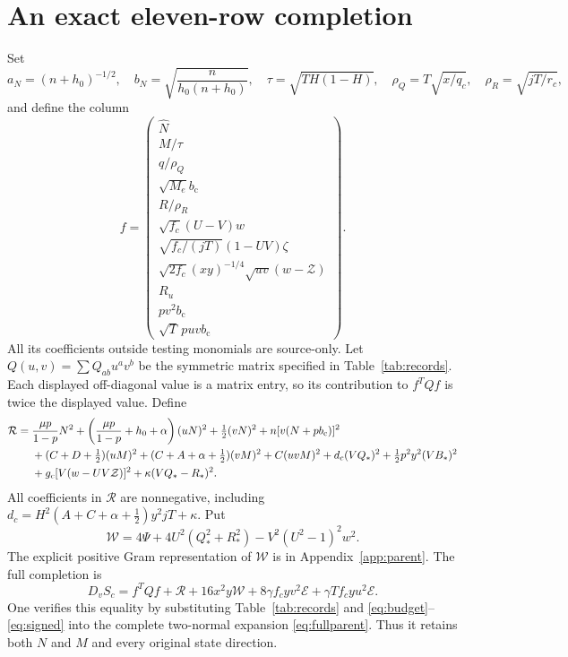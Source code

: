 \documentclass[10pt]{article}
\newcommand{\half}{\tfrac12}
\newcommand{\E}{\mathcal E}
\newcommand{\W}{\mathcal W}
\newcommand{\bc}{b_{\mathrm c}}
\newcommand{\Zc}{\mathcal Z}
\begin{document}
\section{An exact eleven-row completion}
Set
\[
 a_N=(n+h_0)^{-1/2},\quad
 b_N=\sqrt{\frac{n}{h_0(n+h_0)}},\quad
 \tau=\sqrt{TH(1-H)},\quad
 \rho_Q=T\sqrt{x/q_c},\quad \rho_R=\sqrt{jT/r_c},
\]
and define the column
\begin{equation}
 f=\begin{pmatrix}
 \widehat N\\ M/\tau\\ q/\rho_Q\\ \sqrt{M_e}\bc\\ R/\rho_R\\
 \sqrt{f_c}(U-V)w\\ \sqrt{f_c/(jT)}(1-UV)\zeta\\
 \sqrt{2f_c}(xy)^{-1/4}\sqrt{uv}(w-\Zc)\\
 R_u\\ pv^2\bc\\ \sqrt T\,puv\bc
 \end{pmatrix}.
 \label{eq:f}
\end{equation}
All its coefficients outside testing monomials are source-only.
Let $Q(u,v)=\sum Q_{ab}u^av^b$ be the symmetric matrix specified in
Table~\ref{tab:records}. Each displayed off-diagonal value is a matrix entry,
so its contribution to $f^TQf$ is twice the displayed value.
Define
\begin{align}
 \mathcal R={}&\frac{\mu p}{1-p}N^2+
       \left(\frac{\mu p}{1-p}+h_0+\alpha\right)(uN)^2
       +\half(vN)^2+n[v(N+p\bc)]^2 \notag\\
 &+(C+D+\half)(uM)^2+(C+A+\alpha+\half)(vM)^2+C(uvM)^2
       +d_c(VQ_*)^2+\half p^2y^2(VB_*)^2 \notag\\
 &+g_c[V(w-UV\Zc)]^2+\kappa(VQ_*-R_*)^2.
 \label{eq:retained}
\end{align}
All coefficients in $\mathcal R$ are nonnegative, including
$d_c=H^2(A+C+\alpha+\half)y^2jT+\kappa$.
Put
\begin{equation}
 \W=4\Psi+4U^2(Q_*^2+R_*^2)-V^2(U^2-1)^2w^2.
 \label{eq:W19}
\end{equation}
The explicit positive Gram representation of $\W$ is in
Appendix~\ref{app:parent}. The full completion is
\begin{equation}
 D_vS_c=f^TQf+\mathcal R+16x^2y\W
                  +8\gamma f_cyv^2\E+\gamma Tf_cyu^2\E.
 \label{eq:complete}
\end{equation}
One verifies this equality by substituting Table~\ref{tab:records} and
\eqref{eq:budget}--\eqref{eq:signed} into the complete two-normal expansion
\eqref{eq:fullparent}. Thus it retains both $N$ and $M$ and every original
state direction.
\end{document}
